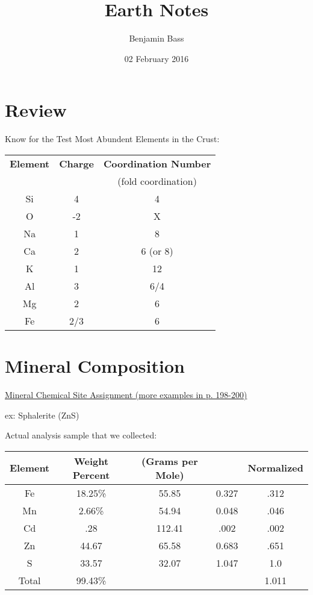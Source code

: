 \documentclass[11pt]{article}
\author{Benjamin Bass}
\date{02 February 2016}
\title{Earth Notes}
\begin{document}
\maketitle
\tableofcontents


\section{Review}
\label{sec-1}
Know for the Test
Most Abundent Elements in the Crust:

\begin{center}
\begin{tabular}{|c|c|c|}
\hline
\textbf{Element} & \textbf{Charge} & \textbf{Coordination Number}\\
 &  & (fold coordination)\\
\hline
Si & 4 & 4\\
O & -2 & X\\
Na & 1 & 8\\
Ca & 2 & 6 (or 8)\\
K & 1 & 12\\
Al & 3 & 6/4\\
Mg & 2 & 6\\
Fe & 2/3 & 6\\
\hline
\end{tabular}
\end{center}

\pagebreak

\section{Mineral Composition}
\label{sec-2}

\uline{Mineral Chemical Site Assignment (more examples in p. 198-200)}

ex: Sphalerite (ZnS)

Actual analysis sample that we collected:

\begin{center}
\begin{tabular}{|c|c|c|c|c|}
\hline
Element & Weight Percent & (Grams per Mole) &  & Normalized\\
\hline
Fe & 18.25\% & 55.85 & 0.327 & .312\\
Mn & 2.66\% & 54.94 & 0.048 & .046\\
Cd & .28 & 112.41 & .002 & .002\\
Zn & 44.67 & 65.58 & 0.683 & .651\\
S & 33.57 & 32.07 & 1.047 & 1.0\\
\hline
Total & 99.43\% &  &  & 1.011\\
\hline
\end{tabular}
\end{center}
\end{document}
